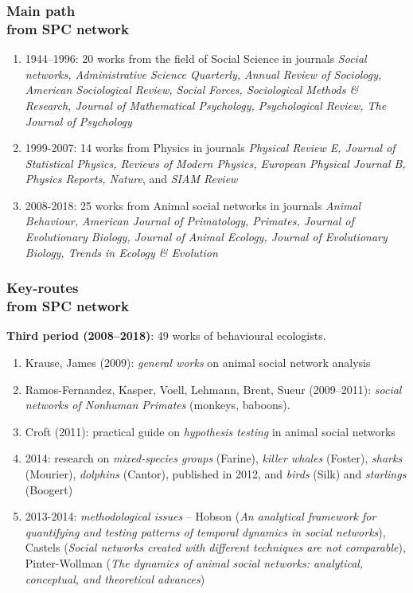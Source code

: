 \documentclass[hyperref={pdfstartview={FitBH -32768},
                         pdfpagemode=FullScreen,
                         plainpages=false,
                         colorlinks=true}
              ]{beamer}
\begin{document}
\begin{frame}[fragile]
\frametitle{Main path \\ \normalsize from SPC network}

\footnotesize
\begin{enumerate}
\item 1944--1996: 20 works from the field of Social Science in journals \textit{Social networks, Administrative Science Quarterly, Annual Review of Sociology, American Sociological Review, Social Forces, Sociological Methods \& Research, Journal of Mathematical Psychology, Psychological Review, The Journal of Psychology}
\item 1999-2007: 14 works from Physics in journals \textit{Physical Review E, Journal of Statistical Physics, Reviews of Modern Physics, European Physical Journal B, Physics Reports, Nature}, and \textit{SIAM Review}
\item 2008-2018: 25 works from Animal social networks in journals \textit{Animal Behaviour, American Journal of Primatology, Primates, Journal of Evolutionary Biology, Journal of Animal Ecology, Journal of Evolutionary Biology, Trends in Ecology \& Evolution}
\end{enumerate}
\end{frame}

\begin{frame}[fragile]
\frametitle{Key-routes \\ \normalsize from SPC network}

\footnotesize
\textbf{Third period (2008--2018)}: 49 works of  behavioural ecologists. 
\begin{enumerate}
\item Krause, James (2009): \textit{general works} on animal social network analysis
\item Ramos-Fernandez, Kasper, Voell, Lehmann, Brent, Sueur (2009--2011): \textit{social networks of Nonhuman Primates} (monkeys, baboons). 
\item Croft (2011): practical guide on \textit{hypothesis testing} in animal social networks
\item 2014: research on \textit{mixed-species groups} (Farine), \textit{killer whales} (Foster), \textit{sharks} (Mourier), \textit{dolphins} (Cantor), published in 2012, and \textit{birds} (Silk) and \textit{starlings} (Boogert)
\item 2013-2014: \textit{methodological issues} -- Hobson (\textit{An analytical framework for quantifying and testing patterns of temporal dynamics in social networks}), Castels (\textit{Social networks created with different techniques are not comparable}), Pinter-Wollman (\textit{The dynamics of animal social networks: analytical, conceptual, and theoretical advances})
\end{enumerate}
\end{frame}
\end{document}
